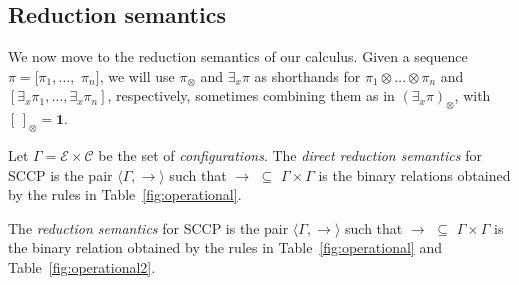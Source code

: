\documentclass{llncs}
\def\1{{\mathbf 1}}
\def\C{{\mathcal C}}
\def\1{{\mathbf 1}}
\def\C{{\mathcal C}}
\def\odiv{\, {\ominus\hspace{-7.7pt} \div} \,}
\begin{document}
\subsection{Reduction semantics}
We now move to the reduction semantics of our calculus. 
%
Given a sequence $\pi = [\pi_1, \ldots,$ $\pi_n]$, we will use 
$\pi_\otimes$ and $\exists_x \pi$
as shorthands for $\pi_1 \otimes \ldots \otimes \pi_n$ and
$[\exists_x \pi_1, \ldots, \exists_x \pi_n]$, respectively,
sometimes combining them as in $(\exists_x \pi)_\otimes$,
with $[\,]_\otimes = \1$.

\begin{definition}[Reductions]\label{def:reductions}
Let $\Gamma = {\mathcal E} \times \C$ be the set of \emph{configurations}.
The \emph{direct reduction semantics} for SCCP is the pair 
$\langle \Gamma,  \to \rangle$
such that $\to \, \, \subseteq \, \,\Gamma \times   \Gamma$ is the 
binary relations obtained by the rules in 
Table~\ref{fig:operational}.

The \emph{reduction semantics} for SCCP is the pair 
$\langle \Gamma,  \rightarrow \rangle$
such that $\rightarrow \, \, \subseteq \, \,\Gamma \times   \Gamma$ is the
binary relation obtained by the rules in 
Table~\ref{fig:operational} and Table~\ref{fig:operational2}.
\end{definition}

\end{document}
